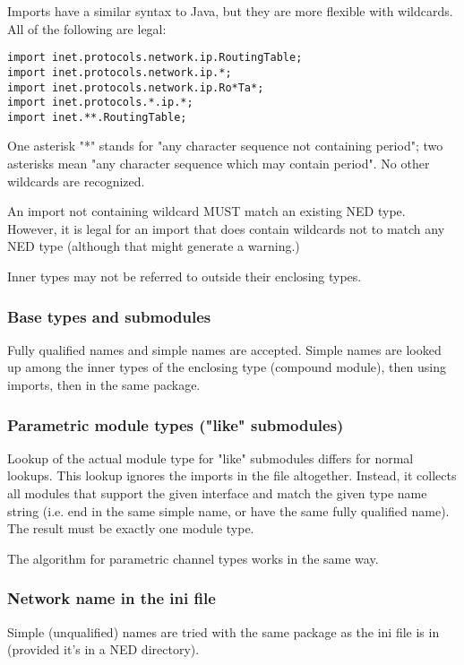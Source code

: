 Imports have a similar syntax to Java, but they are more flexible with wildcards.
All of the following are legal:
\begin{verbatim}
import inet.protocols.network.ip.RoutingTable;
import inet.protocols.network.ip.*;
import inet.protocols.network.ip.Ro*Ta*;
import inet.protocols.*.ip.*;
import inet.**.RoutingTable;
\end{verbatim}

One asterisk "*" stands for "any character sequence not containing
period"; two asterisks mean "any character sequence which may
contain period". No other wildcards are recognized.

An import not containing wildcard MUST match an existing NED type.
However, it is legal for an import that does contain wildcards
not to match any NED type (although that might generate a warning.)

Inner types may not be referred to outside their enclosing types.

\subsubsection{Base types and submodules}

Fully qualified names and simple names are accepted. Simple names
are looked up among the inner types of the enclosing type (compound
module), then using imports, then in the same package.


\subsubsection{Parametric module types ("like" submodules)}

Lookup of the actual module type for "like" submodules differs for normal
lookups. This lookup ignores the imports in the file altogether.
Instead, it collects all modules that support the given interface
and match the given type name string (i.e. end in the same simple name,
or have the same fully qualified name). The result must be exactly
one module type.

The algorithm for parametric channel types works in the same way.


\subsubsection{Network name in the ini file}

Simple (unqualified) names are tried with the same package as the
ini file is in (provided it's in a NED directory).


